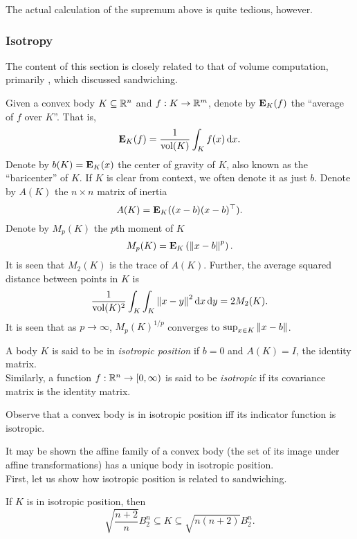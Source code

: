 		The actual calculation of the supremum above is quite tedious, however.


	\subsubsection{Isotropy}

		The content of this section is closely related to that of volume computation, primarily , which discussed sandwiching.

		Given a convex body $K\subseteq\mathbb{R}^n$ and $f:K\to\mathbb{R}^m$, denote by $\textbf{E}_K(f)$ the ``average of $f$ over $K$''. That is,
		\[ \textbf{E}_K(f) = \frac{1}{\operatorname{vol}(K)} \int_{K} f(x)\operatorname{d}\!{x}. \]
		Denote by $b(K)=\textbf{E}_K(x)$ the center of gravity of $K$, also known as the ``baricenter'' of $K$. If $K$ is clear from context, we often denote it as just $b$. Denote by $A(K)$ the $n\times n$ matrix of inertia
		\[ A(K) = \textbf{E}_K((x-b)(x-b)^\top). \]
		Denote by $M_p(K)$ the $p$th moment of $K$
		\[ M_p(K) = \textbf{E}_K\left(\left\lVert x-b\right\rVert^p\right). \]
		It is seen that $M_2(K)$ is the trace of $A(K)$. Further, the average squared distance between points in $K$ is
		\[ \frac{1}{\operatorname{vol}(K)^2} \int_K \int_K \left\lVert x-y\right\rVert^2\operatorname{d}\!{x}\operatorname{d}\!{y} = 2M_2(K). \]
		It is seen that as $p\to\infty$, $M_p(K)^{1/p}$ converges to $\sup_{x\in K} \left\lVert x-b\right\rVert$.

		\begin{fdef}[Isotropic]
			A body $K$ is said to be in \textit{isotropic position} if $b=0$ and $A(K)=I$, the identity matrix.\footnotemark\\
			Similarly, a function $f:\mathbb{R}^n\to[0,\infty)$ is said to be \textit{isotropic} if its covariance matrix is the identity matrix.
		\end{fdef}

		Observe that a convex body is in isotropic position iff its indicator function is isotropic.

		It may be shown the affine family of a convex body (the set of its image under affine transformations) has a unique body in isotropic position.\\
		First, let us show how isotropic position is related to sandwiching.

		\begin{ftheo}
			If $K$ is in isotropic position, then
			\[ \sqrt{\frac{n+2}{n}} B_2^n \subseteq K \subseteq \sqrt{n(n+2)}B_2^n. \]
		\end{ftheo}

